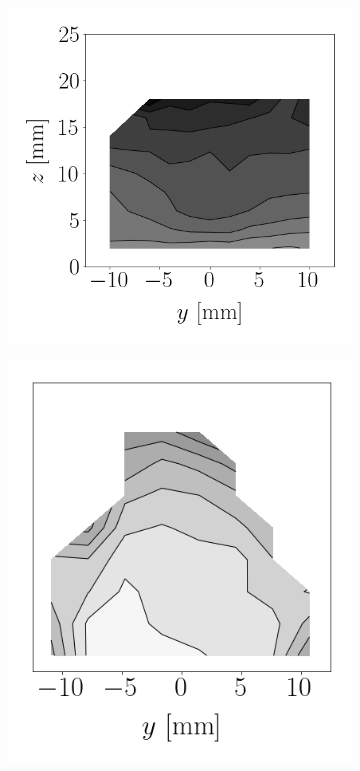 \begin{figure}[t!]
\vspace*{-0.25in}

\flushleft
\begin{subfigure}[b]{0.2\textwidth}
	\flushleft
   \includegraphics[scale=0.4]{./part2_developments/figures_ch6_lagrangian_JICF/apte_model_calibration_u_vw_lognorm/maps/expe_SMD}
\end{subfigure}
\hspace*{0.27in}
\begin{subfigure}[b]{0.2\textwidth}
	\flushleft
   \includegraphics[scale=0.4]{./part2_developments/figures_ch6_lagrangian_JICF/apte_model_calibration_u_vw_lognorm/maps/k1_0p05_k2_0p1_SMD}

\end{subfigure}
\end{figure}
